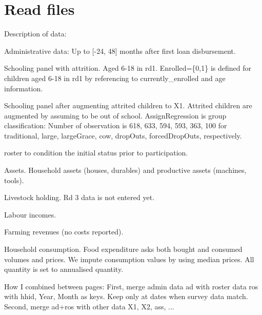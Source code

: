 \section{Read files}





Description of data:
\begin{description}
\vspace{1.0ex}\setlength{\itemsep}{1.0ex}\setlength{\baselineskip}{12pt}
\item[ad]	Administrative data: Up to [-24, 48] months after first loan disbursement.
\item[X1]	Schooling panel with attrition. Aged 6-18 in rd1. \textsf{Enrolled=\{0,1\}} is defined for children aged 6-18 in rd1 by referencing to \textsf{currently\_enrolled} and age information.
\item[X2]	Schooling panel after augmenting attrited children to \textsf{X1}. Attrited children are augmented by assuming to be out of school. \textsf{AssignRegression} is group classification: Number of observation is \textsf{618, 633, 594, 593, 363, 100} for \textsf{traditional, large, largeGrace, cow, dropOuts, forcedDropOuts}, respectively.
\item[ros]	 \textsf{roster} to condition the initial status prior to participation.
\item[ass]	 Assets. Household assets (houses, durables) and productive assets (machines, tools). 
\item[lvo]	Livestock holding. Rd 3 data is not entered yet.
\item[lab]	Labour incomes.
\item[far]	Farming revenues (no costs reported).
\item[con]	Household consumption. Food expenditure asks both bought and consumed volumes and prices. We impute consumption values by using median prices. All quantity is set to annualised quantity.
\end{description}

How I combined between pages: First, merge admin data \textsf{ad} with roster data \textsf{ros} with \textsf{hhid, Year, Month} as keys. Keep only at dates when survey data match. Second, merge \textsf{ad+ros} with other data \textsf{X1}, \textsf{X2}, \textsf{ass}, ... 

